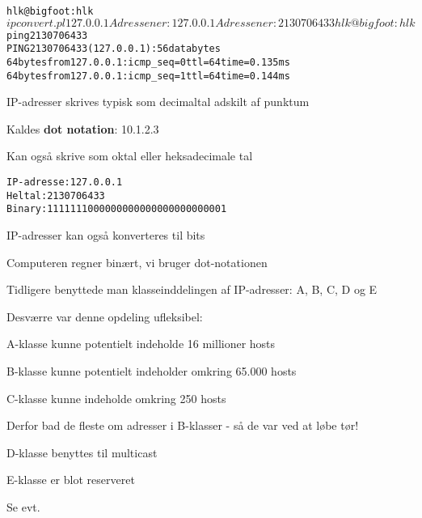 \documentclass[Screen16to9,17pt]{foils}
\begin{document}

\begin{alltt}
hlk@bigfoot:hlk$ ipconvert.pl 127.0.0.1
Adressen er: 127.0.0.1
Adressen er: 2130706433
hlk@bigfoot:hlk$ ping 2130706433
PING 2130706433 (127.0.0.1): 56 data bytes
64 bytes from 127.0.0.1: icmp_seq=0 ttl=64 time=0.135 ms
64 bytes from 127.0.0.1: icmp_seq=1 ttl=64 time=0.144 ms
\end{alltt}

\begin{list1}
\item IP-adresser skrives typisk som decimaltal adskilt af punktum
\item Kaldes {\bf dot notation}: 10.1.2.3
\item Kan også skrive som oktal eller heksadecimale tal
\end{list1}


\begin{alltt}
IP-adresse: 127.0.0.1
Heltal:	2130706433
Binary:	1111111000000000000000000000001
\end{alltt}

\begin{list1}
\item IP-adresser kan også konverteres til bits
\item Computeren regner binært, vi bruger dot-notationen
\end{list1}


\begin{list1}
\item Tidligere benyttede man klasseinddelingen af IP-adresser: A, B, C, D og E
\item Desværre var denne opdeling ufleksibel:
\begin{list2}
\item A-klasse kunne potentielt indeholde 16 millioner hosts
\item B-klasse kunne potentielt indeholder omkring 65.000 hosts
\item C-klasse kunne indeholde omkring 250 hosts
\end{list2}
\item Derfor bad de fleste om adresser i B-klasser - så de var ved at løbe tør!
\item D-klasse benyttes til multicast
\item E-klasse er blot reserveret
\item Se evt. 
\end{list1}
\end{document}

